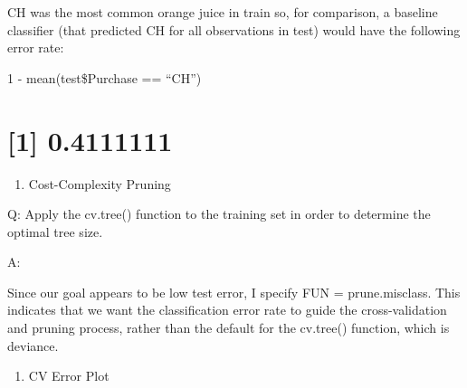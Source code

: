 \documentclass[
]{book}
\newenvironment{Shaded}{\begin{snugshade}}{\end{snugshade}}
\newcommand{\AttributeTok}[1]{\textcolor[rgb]{0.77,0.63,0.00}{#1}}
\newcommand{\CommentTok}[1]{\textcolor[rgb]{0.56,0.35,0.01}{\textit{#1}}}
\newcommand{\DecValTok}[1]{\textcolor[rgb]{0.00,0.00,0.81}{#1}}
\newcommand{\FunctionTok}[1]{\textcolor[rgb]{0.00,0.00,0.00}{#1}}
\newcommand{\NormalTok}[1]{#1}
\newcommand{\OtherTok}[1]{\textcolor[rgb]{0.56,0.35,0.01}{#1}}
\providecommand{\tightlist}{%
  \setlength{\itemsep}{0pt}\setlength{\parskip}{0pt}}
\begin{document}
CH was the most common orange juice in train so, for comparison, a baseline classifier (that predicted CH for all observations in test) would have the following error rate:

1 - mean(test\$Purchase == ``CH'')

\hypertarget{section-1}{%
\section{{[}1{]} 0.4111111}\label{section-1}}

\begin{enumerate}
\def\labelenumi{(\alph{enumi})}
\setcounter{enumi}{5}
\tightlist
\item
  Cost-Complexity Pruning
\end{enumerate}

Q: Apply the cv.tree() function to the training set in order to determine the optimal tree size.

A:

Since our goal appears to be low test error, I specify FUN = prune.misclass. This indicates that we want the classification error rate to guide the cross-validation and pruning process, rather than the default for the cv.tree() function, which is deviance.

\begin{Shaded}
\end{Shaded}

\begin{enumerate}
\def\labelenumi{(\alph{enumi})}
\setcounter{enumi}{6}
\tightlist
\item
  CV Error Plot
\end{enumerate}
\end{document}
